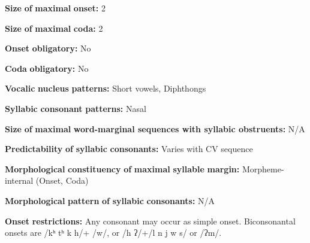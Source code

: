 \documentclass[output=paper]{langsci/langscibook}
\begin{document}
\begin{styleBody}
\textbf{Size} \textbf{of} \textbf{maximal} \textbf{onset:} 2
\end{styleBody}

\begin{styleBody}
\textbf{Size} \textbf{of} \textbf{maximal} \textbf{coda:} 2
\end{styleBody}

\begin{styleBody}
\textbf{Onset} \textbf{obligatory:} No
\end{styleBody}

\begin{styleBody}
\textbf{Coda} \textbf{obligatory:} No
\end{styleBody}

\begin{styleBody}
\textbf{Vocalic} \textbf{nucleus} \textbf{patterns:} Short vowels, Diphthongs
\end{styleBody}

\begin{styleBody}
\textbf{Syllabic} \textbf{consonant} \textbf{patterns:} Nasal
\end{styleBody}

\begin{styleBody}
\textbf{Size} \textbf{of} \textbf{maximal} \textbf{word{}-marginal sequences with syllabic obstruents:} N/A
\end{styleBody}

\begin{styleBody}
\textbf{Predictability} \textbf{of} \textbf{syllabic} \textbf{consonants:} Varies with CV sequence
\end{styleBody}

\begin{styleBody}
\textbf{Morphological} \textbf{constituency} \textbf{of} \textbf{maximal} \textbf{syllable} \textbf{margin:} Morpheme-internal (Onset, Coda)
\end{styleBody}

\begin{styleBody}
\textbf{Morphological} \textbf{pattern} \textbf{of} \textbf{syllabic} \textbf{consonants:} N/A
\end{styleBody}

\begin{styleBody}
\textbf{Onset} \textbf{restrictions:} Any consonant may occur as simple onset. Biconsonantal onsets are /kʰ tʰ k h/+ /w/, or /h ʔ/+/l n j w s/ or /ʔm/.
\end{styleBody}
\end{document}
